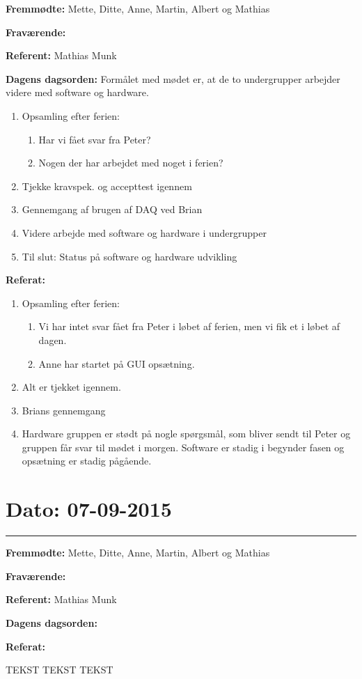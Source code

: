 \textbf{Fremmødte:} Mette, Ditte, Anne, Martin, Albert og Mathias 

\textbf{Fraværende:}

\textbf{Referent:} Mathias Munk

\textbf{Dagens dagsorden:}
\newline
Formålet med mødet er, at de to undergrupper arbejder videre med software og hardware.
\begin{enumerate}
\item Opsamling efter ferien:
\begin{enumerate}
\item Har vi fået svar fra Peter?
\item Nogen der har arbejdet med noget i ferien?
\end{enumerate}

\item Tjekke kravspek. og accepttest igennem

\item Gennemgang af brugen af DAQ ved Brian

\item Videre arbejde med software og hardware i undergrupper

\item Til slut: Status på software og hardware udvikling
\end{enumerate}

\textbf{Referat:}
\newline 
\begin{enumerate}
\item Opsamling efter ferien:
\begin{enumerate}
\item Vi har intet svar fået fra Peter i løbet af ferien, men vi fik et i løbet af dagen.
\item Anne har startet på GUI opsætning.
\end{enumerate}
\item Alt er tjekket igennem.
\item Brians gennemgang
\item Hardware gruppen er stødt på nogle spørgsmål, som bliver sendt til Peter og gruppen får svar til mødet i morgen. Software er stadig i begynder fasen og opsætning er stadig pågående.
\end{enumerate}



\section{Dato: 07-09-2015}
\hrule

\textbf{Fremmødte:} Mette, Ditte, Anne, Martin, Albert og Mathias 

\textbf{Fraværende:}

\textbf{Referent:} Mathias Munk

\textbf{Dagens dagsorden:}
\newline

\textbf{Referat:}
\newline 

TEKST TEKST TEKST